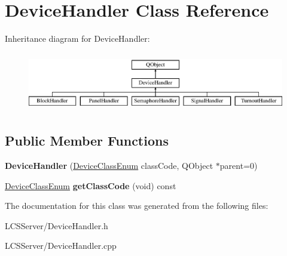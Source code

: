 \hypertarget{class_device_handler}{}\section{Device\+Handler Class Reference}
\label{class_device_handler}
Inheritance diagram for Device\+Handler\+:\begin{figure}[H]
\begin{center}
\leavevmode
\includegraphics[height=2.604651cm]{class_device_handler}
\end{center}
\end{figure}
\subsection*{Public Member Functions}
\begin{DoxyCompactItemize}
\item 
\mbox{\label{class_device_handler_ab16ab4b34974a0f4047851210e4825a7}} 
{\bfseries Device\+Handler} (\hyperlink{_global_defs_8h_ad17679fac69973be9b3a2787a60d7722}{Device\+Class\+Enum} class\+Code, Q\+Object $\ast$parent=0)
\item 
\mbox{\label{class_device_handler_a117ebae8784b275f5dfc8bcf0b32f662}} 
\hyperlink{_global_defs_8h_ad17679fac69973be9b3a2787a60d7722}{Device\+Class\+Enum} {\bfseries get\+Class\+Code} (void) const
\end{DoxyCompactItemize}


The documentation for this class was generated from the following files\+:\begin{DoxyCompactItemize}
\item 
L\+C\+S\+Server/Device\+Handler.\+h\item 
L\+C\+S\+Server/Device\+Handler.\+cpp\end{DoxyCompactItemize}
